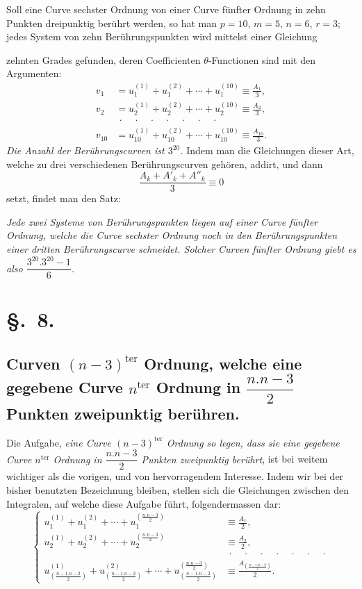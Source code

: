 \documentclass{article}
\begin{document}
Soll eine Curve sechster Ordnung von einer Curve fünfter Ordnung in zehn Punkten dreipunktig berührt werden, so hat man $p = 10$, $m = 5$, $n = 6$, $r = 3$; jedes System von zehn Berührungspunkten wird mittelst einer Gleichung

zehnten Grades gefunden, deren Coefficienten $\theta$-Functionen sind mit den Argumenten:
\[
\begin{aligned}
v_{1} &= u_{1}^{(1)} + u_{1}^{(2)} + \cdots + u_{1}^{(10)} \equiv \frac{A_{1}}{3}, \\
v_{2} &= u_{2}^{(1)} + u_{2}^{(2)} + \cdots + u_{2}^{(10)} \equiv \frac{A_{2}}{3}, \\
&\ \cdot\quad\cdot\quad\cdot\quad\cdot\quad\cdot\quad\cdot\quad\cdot \\
v_{10} &= u_{10}^{(1)} + u_{10}^{(2)} + \cdots + u_{10}^{(10)} \equiv \frac{A_{10}}{3}.
\end{aligned}
\]
\emph{Die Anzahl der Berührungscurven ist $3^{20}$.} Indem man die Gleichungen dieser Art, welche zu drei verschiedenen Berührungscurven gehören, addirt, und dann
\[ \frac{A_{k} + A'_{k} + A''_{k}}{3} \equiv 0 \]
setzt, findet man den Satz:

\emph{Jede zwei Systeme von Berührungspunkten liegen auf einer Curve fünfter Ordnung, welche die Curve sechster Ordnung noch in den Berührungspunkten einer dritten Berührungscurve schneidet. Solcher Curven fünfter Ordnung giebt es also $\dfrac{3^{20}.3^{20}-1}{6}$.}

\section*{§.~8.}
\subsection*{Curven $(n-3)^{\text{ter}}$ Ordnung, welche eine gegebene Curve $n^{\text{ter}}$ Ordnung in $\dfrac{n.n-3}{2}$ Punkten zweipunktig berühren.}

Die Aufgabe, \emph{eine Curve $(n-3)^{\text{ter}}$ Ordnung so legen, dass sie eine gegebene Curve $n^{\text{ter}}$ Ordnung in $\dfrac{n.n-3}{2}$ Punkten zweipunktig berührt}, ist bei weitem wichtiger als die vorigen, und von hervorragendem Interesse. Indem wir bei der bisher benutzten Bezeichnung bleiben, stellen sich die Gleichungen zwischen den Integralen, auf welche diese Aufgabe führt, folgendermassen dar:
\[
\left\{
\begin{aligned}
u_{1}^{(1)} + u_{1}^{(2)} + \cdots + u_{1}^{\left(\frac{n.n-3}{2}\right)} &\equiv \frac{A_{1}}{2}, \\
u_{2}^{(1)} + u_{2}^{(2)} + \cdots + u_{2}^{\left(\frac{n.n-3}{2}\right)} &\equiv \frac{A_{2}}{2}, \\
&\ \cdot\quad\cdot\quad\cdot\quad\cdot\quad\cdot\quad\cdot\quad\cdot \\
u_{\left(\frac{n-1.n-2}{2}\right)}^{(1)} + u_{\left(\frac{n-1.n-2}{2}\right)}^{(2)} + \cdots + u_{\left(\frac{n-1.n-2}{2}\right)}^{\left(\frac{n.n-3}{2}\right)} &\equiv \frac{A_{\left(\frac{n-1.n-2}{2}\right)}}{2}.
\end{aligned}
\right.
\tag{11.}
\]
\end{document}
